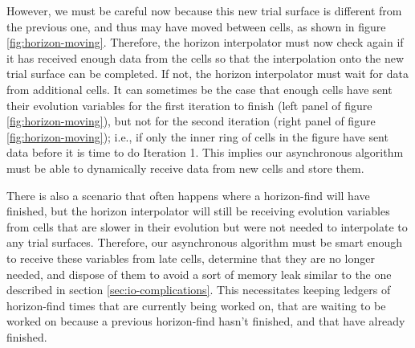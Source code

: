 \begin{bibunit}[unsrtnat]
However, we must be careful now because this new trial surface is different from
the previous one, and thus may have moved between cells, as shown in figure
\ref{fig:horizon-moving}. Therefore, the horizon interpolator must now check
again if it has received enough data from the cells so that the interpolation
onto the new trial surface can be completed. If not, the horizon interpolator
must wait for data from additional cells. It can sometimes be the case that
enough cells have sent their evolution variables for the first iteration to
finish (left panel of figure \ref{fig:horizon-moving}), but not for the second
iteration (right panel of figure \ref{fig:horizon-moving}); i.e., if only the
inner ring of cells in the figure have sent data before it is time to do
Iteration 1. This implies our asynchronous algorithm must be able to dynamically
receive data from new cells and store them.

There is also a scenario that often happens where a horizon-find will have
finished, but the horizon interpolator will still be receiving evolution
variables from cells that are slower in their evolution but were not needed to
interpolate to any trial surfaces. Therefore, our asynchronous algorithm must be
smart enough to receive these variables from late cells, determine that they are
no longer needed, and dispose of them to avoid a sort of memory leak similar to
the one described in section \ref{sec:io-complications}. This necessitates keeping
ledgers of horizon-find times that are currently being worked on, that are
waiting to be worked on because a previous horizon-find hasn't finished, and
that have already finished.


\end{bibunit}
